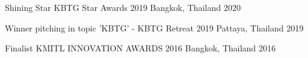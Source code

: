 


\begin{cvhonors}


  \cvhonor
    {Shining Star} %
    {KBTG Star Awards 2019} %
    {Bangkok, Thailand} %
    {2020} %


  \cvhonor
    {Winner} %
    {pitching in topic 'KBTG' - KBTG Retreat 2019} %
    {Pattaya, Thailand} %
    {2019} %


  \cvhonor
    {Finalist} %
    {KMITL INNOVATION AWARDS 2016} %
    {Bangkok, Thailand} %
    {2016} %

\end{cvhonors}
